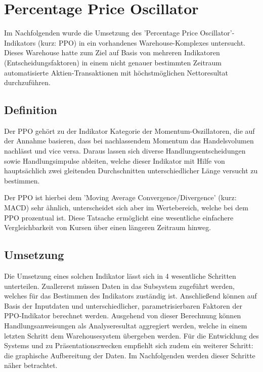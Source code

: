

\section{Percentage Price Oscillator}

Im Nachfolgenden wurde die Umsetzung des ’Percentage Price Oscillator’-Indikators (kurz: PPO) in ein vorhandenes Warehouse-Komplexes untersucht. Dieses Warehouse hatte zum Ziel auf Basis von mehreren Indikatoren (Entscheidungsfaktoren) in einem nicht genauer bestimmten Zeitraum automatisierte Aktien-Transaktionen mit höchstmöglichen Nettoresultat durchzuführen.

\subsection{Definition}
Der PPO gehört zu der Indikator Kategorie der Momentum-Oszil\-latoren, die auf der Annahme basieren, dass bei nachlassendem Momentum das Handelsvolumen nachlässt und vice versa. Daraus lassen sich diverse Handlungsentscheidungen sowie Handlungsimpulse ableiten, welche dieser Indikator mit Hilfe von hauptsächlich zwei gleitenden Durchschnitten unterschiedlicher Länge versucht zu bestimmen. \cite{tvWikiPpo,inoPedPpo}

Der PPO ist hierbei dem 'Moving Average Convergence/Divergence' (kurz: MACD) sehr ähnlich, unterscheidet sich aber im Wertebereich, welche bei dem PPO prozentual ist. Diese Tatsache ermöglicht eine wesentliche einfachere Vergleichbarkeit von Kursen über einen längeren Zeitraum hinweg.\cite{tvWikiMacd}

\subsection{Umsetzung}
Die Umsetzung eines solchen Indikator lässt sich in 4 wesentliche Schritten unterteilen. Zuallererst müssen Daten in das Subsystem zugeführt werden, welches für das Bestimmen des Indikators zuständig ist. Anschließend können auf Basis der Inputdaten und unterschiedlicher, parametrisierbaren Faktoren der PPO-Indikator berechnet werden. Ausgehend von dieser Berechnung können Handlungsanweisungen als Analyseresultat aggregiert werden, welche in einem letzten Schritt dem Warehousesystem übergeben werden. Für die Entwicklung des Systems und zu Präsentationszwecken empfiehlt sich zudem ein weiterer Schritt: die graphische Aufbereitung der Daten. Im Nachfolgenden werden dieser Schritte näher betrachtet.

